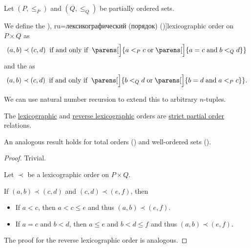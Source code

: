 \begin{definition}\label{def:lexicographic_order}\mimprovised
  Let \( (P, \leq_P) \) and \( (Q, \leq_Q) \) be partially ordered sets.

  We define the \term[en=lexicographic order (\cite[18]{DaveyPriestley2002Lattices}), ru=лексикографический (порядок) (\cite[99]{Гуров2013Решётки})]{lexicographic order} on \( P \times Q \) as
  \begin{equation}\label{eq:def:lexicographic_order}
    (a, b) \prec (c, d) \thickspace \T{if and only if} \thickspace \parens[\Big]{ a <_P c \T{or} \parens[\Big]{ a = c \T{and} b <_Q d } }
  \end{equation}
  and the  as
  \begin{equation}\label{eq:def:lexicographic_order/reverse}
    (a, b) \prec (c, d) \thickspace \T{if and only if} \thickspace \parens[\Big]{ b <_Q d \T{or} \parens[\Big]{ b = d \T{and} a <_P c } }.
  \end{equation}
\end{definition}
\begin{comments}
  \item We can use natural number recursion to extend this to arbitrary \( n \)-tuples.
\end{comments}

\begin{proposition}\label{thm:lexicographic_order_is_partial_order}
  The \hyperref[eq:def:lexicographic_order]{lexicographic} and \hyperref[eq:def:lexicographic_order/reverse]{reverse lexicographic} orders are \hyperref[def:partially_ordered_set]{strict partial order} relations.
\end{proposition}
\begin{comments}
  \item An analogous result holds for total orders () and well-ordered sets ().
\end{comments}
\begin{proof}
   Trivial.

   Let \( \prec \) be a lexicographic order on \( P \times Q \).

  If \( (a, b) \prec (c, d) \) and \( (c, d) \prec (e, f) \), then
  \begin{itemize}
    \item If \( a < c \), then \( a < c \leq e \) and thus \( (a, b) \prec (e, f) \).

    \item If \( a = c \) and \( b < d \), then \( a \leq e \) and \( b < d \leq f \) and thus \( (a, b) \prec (e, f) \).
  \end{itemize}

   The proof for the reverse lexicographic order is analogous.
\end{proof}

